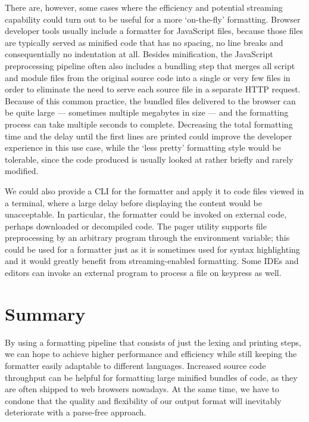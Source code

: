 There are, however, some cases where the efficiency and potential streaming capability could
turn out to be useful for a more `on-the-fly' formatting.
Browser developer tools usually include a formatter for JavaScript files,
because those files are typically served as minified code that has
no spacing, no line breaks and consequentially no indentation at all.
Besides minification, the JavaScript preprocessing pipeline often also includes a bundling step
that merges all script and module files from the original source code into a single or very few
files in order to eliminate the need to serve each source file in a separate HTTP request.
Because of this common practice, the bundled files delivered to the browser can be quite large ---
sometimes multiple megabytes in size --- and the formatting process can take multiple seconds to complete.
Decreasing the total formatting time and the delay until the first lines are printed
could improve the developer experience in this use case,
while the `less pretty' formatting style would be tolerable,
since the code produced is usually looked at rather briefly and rarely modified.

We could also provide a CLI for the formatter and apply it to code files viewed in a terminal,
where a large delay before displaying the content would be unacceptable.
In particular, the formatter could be invoked on external code, perhaps downloaded or decompiled code.
The  pager utility supports file preprocessing by an arbitrary program
through the  environment variable; \autocite{lessMan}
this could be used for a formatter just as it is sometimes used for syntax highlighting
and it would greatly benefit from streaming-enabled formatting.
Some IDEs and editors can invoke an external program to process a file on keypress as well.

\section{Summary}
By using a formatting pipeline that consists of
just the lexing and printing steps,
we can hope to achieve higher performance and efficiency
while still keeping the formatter
easily adaptable to different languages.
Increased source code throughput can be helpful
for formatting large minified bundles of code,
as they are often shipped to web browsers nowadays.
At the same time, we have to condone that
the quality and flexibility of our output format
will inevitably deteriorate with a parse-free approach.
